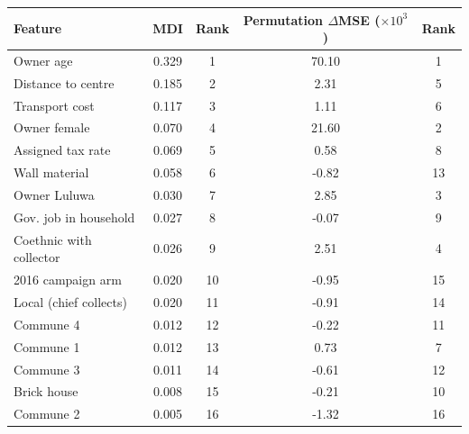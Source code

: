\begin{tabular}{lcccc}
\hline
 Feature & MDI & Rank & Permutation $\Delta$MSE ($\times 10^3$) & Rank \\
\hline
Owner age & 0.329 & 1 & 70.10 & 1 \\
Distance to centre & 0.185 & 2 & 2.31 & 5 \\
Transport cost & 0.117 & 3 & 1.11 & 6 \\
Owner female & 0.070 & 4 & 21.60 & 2 \\
Assigned tax rate & 0.069 & 5 & 0.58 & 8 \\
Wall material & 0.058 & 6 & -0.82 & 13 \\
Owner Luluwa & 0.030 & 7 & 2.85 & 3 \\
Gov. job in household & 0.027 & 8 & -0.07 & 9 \\
Coethnic with collector & 0.026 & 9 & 2.51 & 4 \\
2016 campaign arm & 0.020 & 10 & -0.95 & 15 \\
Local (chief collects) & 0.020 & 11 & -0.91 & 14 \\
Commune 4 & 0.012 & 12 & -0.22 & 11 \\
Commune 1 & 0.012 & 13 & 0.73 & 7 \\
Commune 3 & 0.011 & 14 & -0.61 & 12 \\
Brick house & 0.008 & 15 & -0.21 & 10 \\
Commune 2 & 0.005 & 16 & -1.32 & 16 \\
\hline
\end{tabular}
